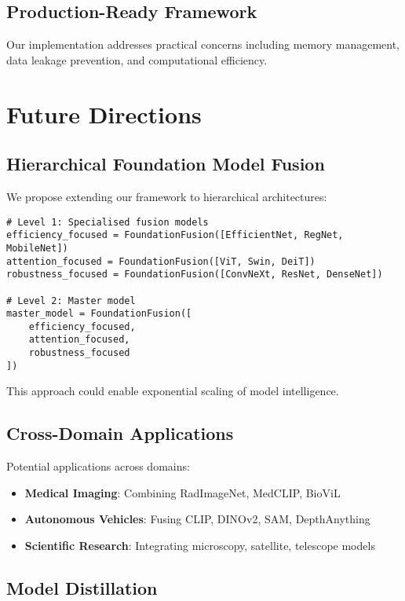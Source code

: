 \documentclass[11pt,a4paper]{article}
\begin{document}
\subsection{Production-Ready Framework}

Our implementation addresses practical concerns including memory management, data leakage prevention, and computational efficiency.

\section{Future Directions}

\subsection{Hierarchical Foundation Model Fusion}

We propose extending our framework to hierarchical architectures:

\begin{lstlisting}[caption=Hierarchical Fusion Concept]
# Level 1: Specialised fusion models
efficiency_focused = FoundationFusion([EfficientNet, RegNet, MobileNet])
attention_focused = FoundationFusion([ViT, Swin, DeiT])
robustness_focused = FoundationFusion([ConvNeXt, ResNet, DenseNet])

# Level 2: Master model
master_model = FoundationFusion([
    efficiency_focused,
    attention_focused,
    robustness_focused
])
\end{lstlisting}

This approach could enable exponential scaling of model intelligence.

\subsection{Cross-Domain Applications}

Potential applications across domains:

\begin{itemize}
    \item \textbf{Medical Imaging}: Combining RadImageNet, MedCLIP, BioViL
    \item \textbf{Autonomous Vehicles}: Fusing CLIP, DINOv2, SAM, DepthAnything
    \item \textbf{Scientific Research}: Integrating microscopy, satellite, telescope models
\end{itemize}

\subsection{Model Distillation}
\end{document}
